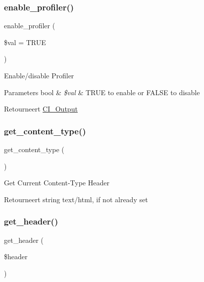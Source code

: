 \subsubsection{\texorpdfstring{enable\_profiler()}{enable\_profiler()}}
{\footnotesize\ttfamily enable\+\_\+profiler (\begin{DoxyParamCaption}\item[{}]{\$val = {\ttfamily TRUE} }\end{DoxyParamCaption})}

Enable/disable Profiler


\begin{DoxyParams}[1]{Parameters}
bool & {\em \$val} & T\+R\+UE to enable or F\+A\+L\+SE to disable \\
\hline
\end{DoxyParams}
\begin{DoxyReturn}{Retourneert}
\mbox{\hyperlink{class_c_i___output}{C\+I\+\_\+\+Output}} 
\end{DoxyReturn}
\mbox{\label{class_c_i___output_a4d8c59d65c47c9146dbc1c7d0c4eccf2}} 
\subsubsection{\texorpdfstring{get\_content\_type()}{get\_content\_type()}}
{\footnotesize\ttfamily get\+\_\+content\+\_\+type (\begin{DoxyParamCaption}{ }\end{DoxyParamCaption})}

Get Current Content-\/\+Type Header

\begin{DoxyReturn}{Retourneert}
string \textquotesingle{}text/html\textquotesingle{}, if not already set 
\end{DoxyReturn}
\mbox{\label{class_c_i___output_afc84ca7f4f93817160ea738f2f899a74}} 
\subsubsection{\texorpdfstring{get\_header()}{get\_header()}}
{\footnotesize\ttfamily get\+\_\+header (\begin{DoxyParamCaption}\item[{}]{\$header }\end{DoxyParamCaption})}

